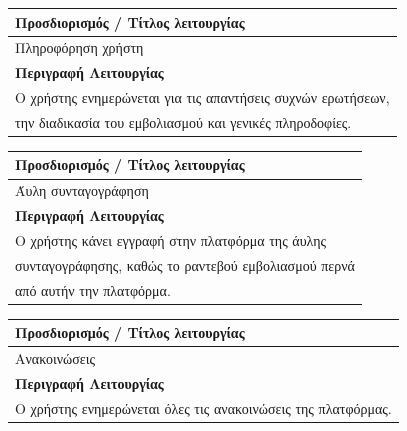 \documentclass[12pt]{turabian-researchpaper}
\begin{document}
\begin{center}
    \begin{table}[]
        \centering
        \begin{tabular}{|l|}
            \hline
            \textbf{Προσδιορισμός / Τίτλος λειτουργίας}                 \\ \hline
            Πληροφόρηση χρήστη                                          \\ \hline
            \textbf{Περιγραφή Λειτουργίας}                              \\ \hline
            Ο χρήστης ενημερώνεται για τις απαντήσεις συχνών ερωτήσεων, \\
            την διαδικασία του εμβολιασμού και γενικές πληροδοφίες.     \\ \hline
        \end{tabular}
    \end{table}

    \begin{table}[]
        \centering
        \begin{tabular}{|l|}
            \hline
            \textbf{Προσδιορισμός / Τίτλος λειτουργίας}          \\ \hline
            Άυλη συνταγογράφηση                                  \\ \hline
            \textbf{Περιγραφή Λειτουργίας}                       \\ \hline
            Ο χρήστης κάνει εγγραφή στην πλατφόρμα της άυλης     \\
            συνταγογράφησης, καθώς το ραντεβού εμβολιασμού περνά \\
            από αυτήν την πλατφόρμα.                             \\ \hline
        \end{tabular}
    \end{table}

    \begin{table}[]
        \centering
        \begin{tabular}{|l|}
            \hline
            \textbf{Προσδιορισμός / Τίτλος λειτουργίας}                  \\ \hline
            Ανακοινώσεις                                                 \\ \hline
            \textbf{Περιγραφή Λειτουργίας}                               \\ \hline
            Ο χρήστης ενημερώνεται όλες τις ανακοινώσεις της πλατφόρμας. \\ \hline
        \end{tabular}
    \end{table}

\end{center}
\end{document}
